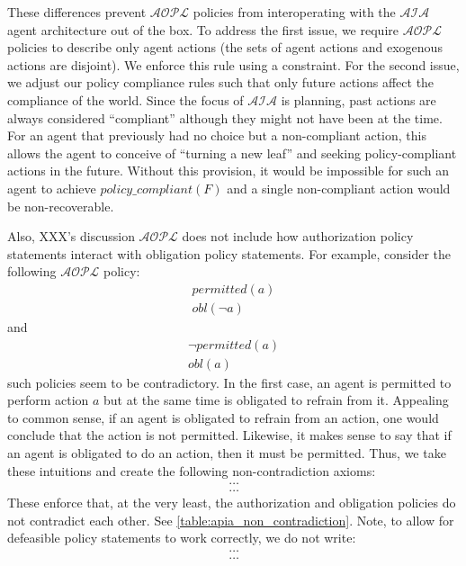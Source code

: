 These differences prevent $\mathcal{AOPL}$ policies from interoperating with the $\mathcal{AIA}$ agent architecture out of the box.
To address the first issue, we require $\mathcal{AOPL}$ policies to describe only agent actions (the sets of agent actions and exogenous actions are disjoint).
We enforce this rule using a constraint.
For the second issue, we adjust our policy compliance rules such that only future actions affect the compliance of the world.
Since the focus of $\mathcal{AIA}$ is planning, past actions are always considered ``compliant'' although they might not have been at the time.
For an agent that previously had no choice but a non-compliant action, this allows the agent to conceive of ``turning a new leaf'' and seeking policy-compliant actions in the future.
Without this provision, it would be impossible for such an agent to achieve $policy\_compliant(F)$ and a single non-compliant action would be non-recoverable.

Also, XXX's discussion $\mathcal{AOPL}$ does not include how authorization policy statements interact with obligation policy statements.
For example, consider the following $\mathcal{AOPL}$ policy:
\begin{gather}
    permitted(a) \\
    obl(\neg a)
\end{gather}
and
\begin{gather}
    \neg permitted(a) \\
    obl(a)
\end{gather}
such policies seem to be contradictory.
In the first case, an agent is permitted to perform action $a$ but at the same time is obligated to refrain from it.
Appealing to common sense, if an agent is obligated to refrain from an action, one would conclude that the action is not permitted.
Likewise, it makes sense to say that if an agent is obligated to do an action, then it must be permitted.
Thus, we take these intuitions and create the following non-contradiction axioms:
\begin{gather}
    \dots \\
    \dots
\end{gather}
These enforce that, at the very least, the authorization and obligation policies do not contradict each other.
See \cref{table:apia_non_contradiction}.
Note, to allow for defeasible policy statements to work correctly, we do not write:
\begin{gather}
    \dots \\
    \dots
\end{gather}

